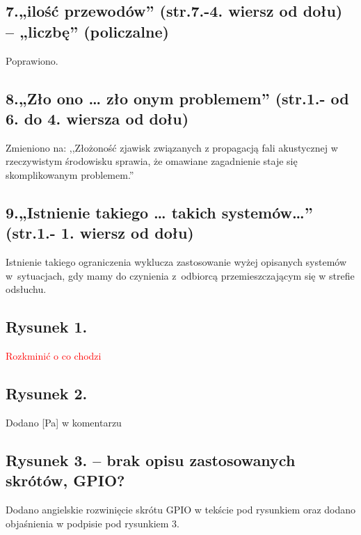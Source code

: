 \documentclass[12pt]{article}
\begin{document}
\subsection{7.„ilość przewodów” (str.7.-4. wiersz od dołu) – „liczbę” (policzalne)}
Poprawiono.

\subsection{8.„Zło ono … zło onym problemem” (str.1.- od 6. do 4. wiersza od dołu)}
Zmieniono na: ,,Złożoność
zjawisk związanych z propagacją fali akustycznej w rzeczywistym środowisku
sprawia, że omawiane zagadnienie staje się skomplikowanym problemem.''

\subsection{9.„Istnienie takiego … takich systemów…” (str.1.- 1. wiersz od dołu)}
Istnienie takiego ograniczenia wyklucza zastosowanie wyżej opisanych systemów w~sytuacjach, gdy mamy do czynienia z~odbiorcą przemieszczającym się w strefie
odsłuchu.

\subsection{Rysunek 1.}
\textcolor{red}{Rozkminić o co chodzi}

\subsection{Rysunek 2.} 
Dodano [Pa] w komentarzu

\subsection{Rysunek 3. – brak opisu zastosowanych skrótów, GPIO?}

Dodano angielskie rozwinięcie skrótu GPIO w tekście pod rysunkiem oraz dodano objaśnienia w podpisie pod rysunkiem 3.


    
\end{document}
